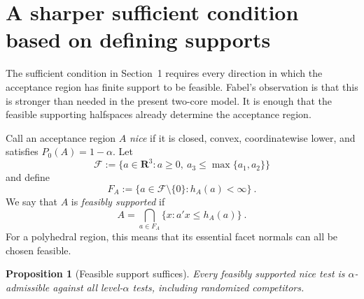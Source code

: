 \documentclass[12pt]{article}
\newtheorem{proposition}{Proposition}
\theoremstyle{remark}
\begin{document}
\section{A sharper sufficient condition based on defining supports}

The sufficient condition in Section~1 requires every direction in which the
acceptance region has finite support to be feasible.  Fabel's observation is
that this is stronger than needed in the present two-core model.  It is enough
that the feasible supporting halfspaces already determine the acceptance
region.

Call an acceptance region $A$ \emph{nice} if it is closed, convex,
coordinatewise lower, and satisfies $P_0(A)=1-\alpha$.  Let
\[
\mathcal F
:=
\{a\in\mathbf R^3:a\ge0,\ a_3\le\max\{a_1,a_2\}\}
\]
and define
\[
F_A:=\{a\in\mathcal F\setminus\{0\}:h_A(a)<\infty\}~.
\]
We say that $A$ is \emph{feasibly supported} if
\begin{equation}\label{eq:feasibly-supported}
A
=
\bigcap_{a\in F_A}\{x:a'x\le h_A(a)\}~.
\end{equation}
For a polyhedral region, this means that its essential facet normals can all
be chosen feasible.

\begin{proposition}[Feasible support suffices]
\label{prop:feasible-support}
Every feasibly supported nice test is $\alpha$-admissible against all
level-$\alpha$ tests, including randomized competitors.
\end{proposition}
\end{document}
